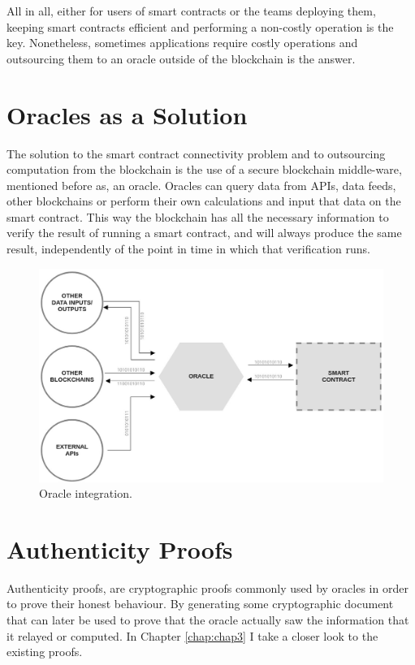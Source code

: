 All in all, either for users of smart contracts or the teams deploying them, keeping smart contracts efficient and performing a non-costly operation is the key. Nonetheless, sometimes applications require costly operations and outsourcing them to an oracle outside of the blockchain is the answer.



\section{Oracles as a Solution}
The solution to the smart contract connectivity problem and to outsourcing computation from the blockchain is the use of a secure blockchain middle-ware, mentioned before as, an oracle. Oracles can query data from APIs, data feeds, other blockchains or perform their own calculations and input that data on the smart contract. This way the blockchain has all the necessary information to verify the result of running a smart contract, and will always produce the same result, independently of the point in time in which that verification runs.


\begin{figure}[H]
  \begin{center}
    \leavevmode
    \includegraphics[width=\textwidth]{figures/oracle.jpg}
    \caption{Oracle integration.}
    \label{fig:/figures/oracle.jpg}
  \end{center}
\end{figure}

\section{Authenticity Proofs}
Authenticity proofs, are cryptographic proofs commonly used by oracles in order to prove their honest behaviour. By generating some cryptographic document that can later be used to prove that the oracle actually saw the information that it relayed or computed. In Chapter \ref{chap:chap3} I take a closer look to the existing proofs.



